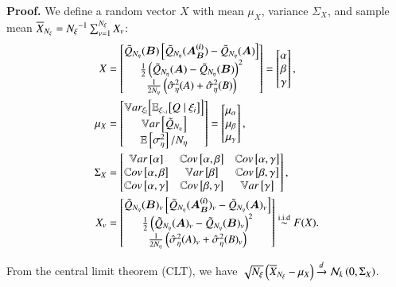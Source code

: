 \textbf{Proof.}
We define a random vector $X$ with mean $\mu_X$, variance $\Sigma_X$, and sample mean $\overline{X}_{{N_\xi}} = {N_\xi}^{-1} \sum_{v=1}^{{N_\xi}} X_v$:
\begin{align} \label{eq:xmatrix}
    X &= \begin{bmatrix} \tilde{Q}_{{N_\eta}}(\bm{B}) \left[ \tilde{Q}_{{N_\eta}}(\bm{A_B^{(i)}}) - \tilde{Q}_{{N_\eta}}(\bm{A}) \right] \\
                        \frac{1}{2} \left( \tilde{Q}_{{N_\eta}}(\bm{A}) - \tilde{Q}_{{N_\eta}}(\bm{B}) \right)^2 \\
                        \frac{1}{2{N_\eta}} \left( \hat{\sigma}^2_\eta(A) + \hat{\sigma}^2_\eta(B) \right)
        \end{bmatrix}
        = \begin{bmatrix} \alpha \\ \beta \\ \gamma \end{bmatrix}, \\
    \mu_X &= \begin{bmatrix} \mathbb{V}ar_{\xi_{i}} \Bigl[ \mathbb{E}_{\xi_{\sim i}}\bigl[ Q\mid\xi_i \bigr] \Bigr] \\ \mathbb{V}ar\left[\tilde{Q}_{{N_\eta}}\right] \\ \mathbb{E}\left[\sigma^2_\eta\right]/{N_\eta} \end{bmatrix} 
        = \begin{bmatrix} \mu_\alpha \\ \mu_\beta \\ \mu_\gamma \end{bmatrix}, \\
    \Sigma_X &= \begin{bmatrix}
        \mathbb{V}ar\left[\alpha\right] & \mathbb{C}ov\left[\alpha,\beta\right] & \mathbb{C}ov\left[\alpha,\gamma\right] \\ 
        \mathbb{C}ov\left[\alpha,\beta\right] & \mathbb{V}ar\left[\beta\right] & \mathbb{C}ov\left[\beta,\gamma\right] \\
        \mathbb{C}ov\left[\alpha,\gamma\right] & \mathbb{C}ov\left[\beta,\gamma\right] & \mathbb{V}ar\left[\gamma\right]
    \end{bmatrix} , \\
    X_v &= \begin{bmatrix} \tilde{Q}_{{N_\eta}}(\bm{B})_v \left[ \tilde{Q}_{{N_\eta}}(\bm{A_B^{(i)}})_v - \tilde{Q}_{{N_\eta}}(\bm{A})_v \right] \\
                        \frac{1}{2} \left( \tilde{Q}_{{N_\eta}}(\bm{A})_v - \tilde{Q}_{{N_\eta}}(\bm{B})_v \right)^2 \\
                        \frac{1}{2{N_\eta}} \left( \hat{\sigma}^2_\eta(A)_v + \hat{\sigma}^2_\eta(B)_v \right)
        \end{bmatrix} \overset{\operatorname{i.i.d}}{\sim} F(X) .
\end{align}

From the central limit theorem (CLT), we have $\sqrt{{N_\xi}} \left( \overline{X}_{{N_\xi}} - \mu_X \right) \xrightarrow{d} \mathcal{N}_k \left(0, \Sigma_X \right)$. 

